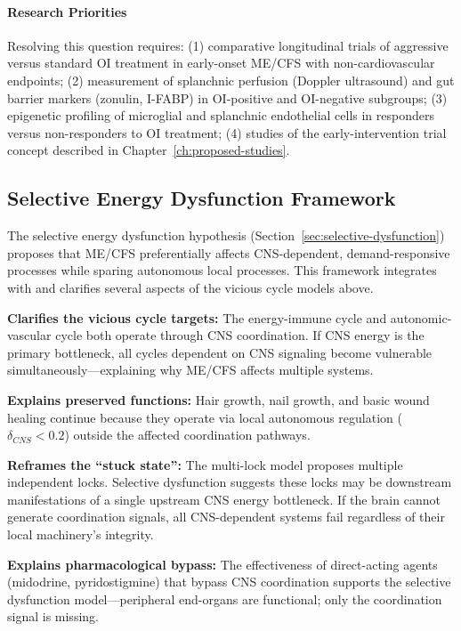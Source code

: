 \begin{keypoint}
\paragraph{Research Priorities}
Resolving this question requires: (1) comparative longitudinal trials of aggressive versus standard OI treatment in early-onset ME/CFS with non-cardiovascular endpoints; (2) measurement of splanchnic perfusion (Doppler ultrasound) and gut barrier markers (zonulin, I-FABP) in OI-positive and OI-negative subgroups; (3) epigenetic profiling of microglial and splanchnic endothelial cells in responders versus non-responders to OI treatment; (4) studies of the early-intervention trial concept described in Chapter~\ref{ch:proposed-studies}.

\end{keypoint}


\subsection{Selective Energy Dysfunction Framework}
\label{subsec:selective-dysfunction-integration}

The selective energy dysfunction hypothesis (Section~\ref{sec:selective-dysfunction}) proposes that ME/CFS preferentially affects CNS-dependent, demand-responsive processes while sparing autonomous local processes. This framework integrates with and clarifies several aspects of the vicious cycle models above.

\begin{keypoint}
\textbf{Clarifies the vicious cycle targets:} The energy-immune cycle and autonomic-vascular cycle both operate through CNS coordination. If CNS energy is the primary bottleneck, all cycles dependent on CNS signaling become vulnerable simultaneously---explaining why ME/CFS affects multiple systems.

\textbf{Explains preserved functions:} Hair growth, nail growth, and basic wound healing continue because they operate via local autonomous regulation ($\delta_{CNS} < 0.2$) outside the affected coordination pathways.

\textbf{Reframes the ``stuck state'':} The multi-lock model proposes multiple independent locks. Selective dysfunction suggests these locks may be downstream manifestations of a single upstream CNS energy bottleneck. If the brain cannot generate coordination signals, all CNS-dependent systems fail regardless of their local machinery's integrity.

\textbf{Explains pharmacological bypass:} The effectiveness of direct-acting agents (midodrine, pyridostigmine) that bypass CNS coordination supports the selective dysfunction model---peripheral end-organs are functional; only the coordination signal is missing.
\end{keypoint}

